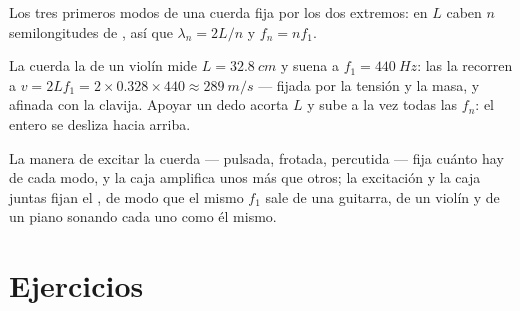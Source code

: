 \begin{omfigure}

{\small Los tres primeros modos de una cuerda fija por los dos extremos:
en $L$ caben $n$ semilongitudes de , así que $\lambda_n = 2L/n$ y
$f_n = nf_1$.}
\end{omfigure}

\begin{example}\label{ex:g12:sound-acoustics:violin}
La cuerda la de un violín mide $L = \qty{32.8}{cm}$ y suena a
$f_1 = \qty{440}{Hz}$: las  la recorren a
$v = 2Lf_1 = 2 \times 0.328 \times 440 \approx \qty{289}{m/s}$ ---
fijada por la tensión y la masa, y afinada con la clavija. Apoyar un
dedo acorta $L$ y sube a la vez todas las $f_n$: el  entero se
desliza hacia arriba.
\end{example}

\begin{remark}\label{rem:g12:sound-acoustics:instruments}
La manera de excitar la cuerda --- pulsada, frotada, percutida --- fija
cuánto hay de cada modo, y la caja amplifica unos  más que
otros; la excitación y la caja juntas fijan el , de modo que el
mismo $f_1$ sale de una guitarra, de un violín y de un piano sonando
cada uno como él mismo.
\end{remark}

\section{Ejercicios}

